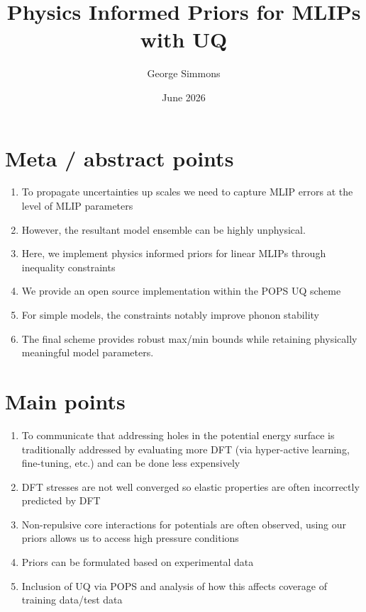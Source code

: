 \documentclass{article}
\title{Physics Informed Priors for MLIPs with UQ}
\author{George Simmons}
\date{June 2026}
\begin{document}
\maketitle
\vspace{2pc}

\section{Meta / abstract points}
\begin{enumerate}
    \item To propagate uncertainties up scales we need to capture MLIP errors at the level of MLIP parameters
    \item However, the resultant model ensemble can be highly unphysical.
    \item Here, we implement physics informed priors for linear MLIPs through inequality constraints
    \item We provide an open source implementation within the POPS UQ scheme
    \item For simple models, the constraints notably improve phonon stability
    \item The final scheme provides robust max/min bounds while retaining physically meaningful model parameters.
\end{enumerate}

\section{Main points}
\begin{enumerate}
    \item To communicate that addressing holes in the potential energy surface is traditionally addressed by evaluating more DFT (via hyper-active learning, fine-tuning, etc.) and can be done less expensively
    \item DFT stresses are not well converged so elastic properties are often incorrectly predicted by DFT
    \item Non-repulsive core interactions for potentials are often observed, using our priors allows us to access high pressure conditions
    \item Priors can be formulated based on experimental data
    \item Inclusion of UQ via POPS and analysis of how this affects coverage of training data/test data
\end{enumerate}

\end{document}
